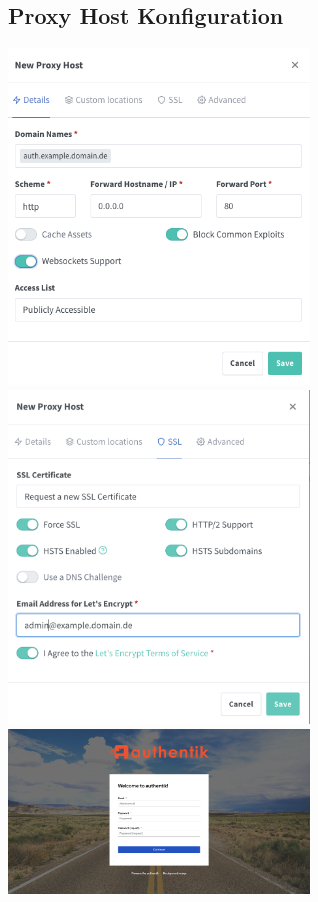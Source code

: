 \subsection{Proxy Host Konfiguration}
\label{app:ProxyHostConfig}
\includegraphics[width=8cm]{Bilder/Authentik-Doc/NewProxyHost.png}
\includegraphics[width=8cm]{Bilder/Authentik-Doc/NewProxyHostSSL.png}
\includegraphics[width=8cm]{Bilder/Authentik-Doc/WP_00_WelcomePageFirstTimeAfterSetup.png}

